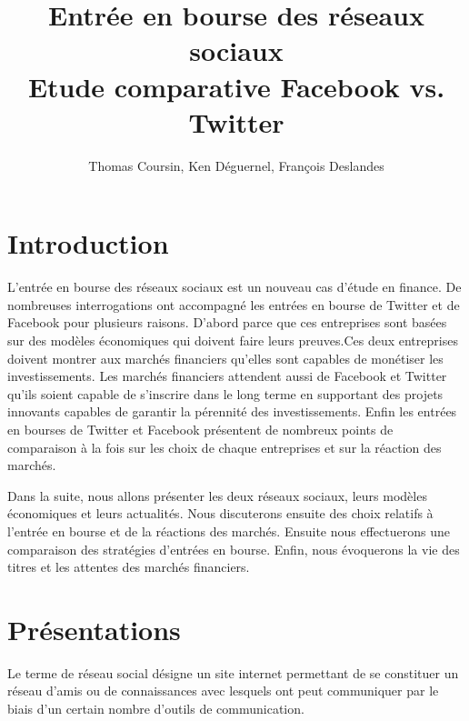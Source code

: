\documentclass[a4paper,10pt]{article}
\author{Thomas Coursin, Ken Déguernel, François Deslandes}
\affil{Génie Mathématique 5ème année}
\affil{A l'attention de Mme Lehmann}
\title{\Huge{Entrée en bourse des réseaux sociaux}\\
\LARGE{Etude comparative Facebook vs. Twitter}\\
\vspace{10mm}
}
\begin{document}
\maketitle\thispagestyle{empty}
 
\newpage\null\thispagestyle{empty}\setcounter{page}{0}

\tableofcontents

\clearpage



\section{Introduction}

L'entrée en bourse des réseaux sociaux est un nouveau cas d'étude en finance. De nombreuses interrogations ont accompagné les entrées en bourse de Twitter et de Facebook pour plusieurs raisons.
D'abord parce que ces entreprises sont basées sur des modèles économiques qui doivent faire leurs preuves.Ces deux entreprises doivent montrer aux marchés financiers qu'elles sont capables de monétiser les investissements.
Les marchés financiers attendent aussi de Facebook et Twitter qu'ils soient capable de s'inscrire dans le long terme en supportant des projets innovants capables de garantir la pérennité des investissements.
Enfin les entrées en bourses de Twitter et Facebook présentent de nombreux points de comparaison à la fois sur les choix de chaque entreprises et sur la réaction des marchés.


Dans la suite, nous allons présenter les deux réseaux sociaux, leurs modèles économiques et leurs actualités. Nous discuterons ensuite des choix relatifs à l'entrée en bourse et de la réactions des marchés. Ensuite nous effectuerons une comparaison des stratégies d'entrées en bourse. Enfin, nous évoquerons la vie des titres et les attentes des marchés financiers.



\section{Présentations}
Le terme de réseau social désigne un site internet permettant de se constituer un réseau d'amis ou de connaissances avec lesquels ont peut communiquer par le biais d'un certain nombre d'outils de communication.
\end{document}
